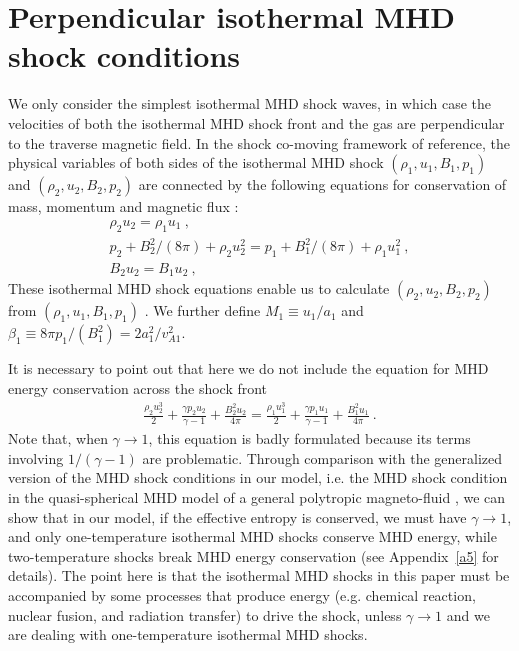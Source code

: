 \documentclass[fleqn,usenatbib]{mnras}
\begin{document}


\section{Perpendicular isothermal MHD shock conditions}
\label{s3}
We only consider the simplest isothermal MHD shock waves, in which case the velocities of both the isothermal MHD shock front and the gas are perpendicular to the traverse magnetic field. In the shock co-moving framework of reference, the physical variables of both sides of the isothermal MHD shock $(\rho_{1}, u_{1}, B_{1}, p_{1})$ and $(\rho_{2}, u_{2}, B_{2}, p_{2})$ are connected by the following equations for conservation of mass, momentum and magnetic flux \citep{yuLou2006}:
\begin{gather}
\rho_{2}u_{2}=\rho_{1}u_{1}\ ,\label{e30}\\
p_{2}+B_{2}^{2}/(8\pi)+\rho_{2}u_{2}^{2}
 =p_{1}+B_{1}^{2}/(8\pi)+\rho_{1}u_{1}^{2}\ ,\label{e31}\\
B_{2}u_{2}=B_{1}u_{2}\ ,\label{e32}
\end{gather}
These isothermal MHD shock equations enable us to calculate $(\rho_{2}, u_{2}, B_{2}, p_{2})$ from $(\rho_{1}, u_{1}, B_{1}, p_{1})$ .
We further define $M_{1}\equiv u_{1}/a_{1}$ and $\beta_{1}\equiv 8\pi p_{1}/\left(B_{1}^{2}\right)=2a_{1}^{2}/v_{A1}^{2}$. 

It is necessary to point out that here we do not include the equation for MHD energy conservation across the shock front 
\begin{gather}
\frac{\rho_{2} u_{2}^{3}}{2}+\frac{\gamma p_{2} u_{2}}{\gamma-1}+\frac{B_{2}^{2}u_{2}}{4\pi}=\frac{\rho_{1} u_{1}^{3}}{2}+\frac{\gamma p_{1} u_{1}}{\gamma-1}+\frac{B_{1}^{2}u_{1}}{4\pi}\ .\label{ex2}
\end{gather}
Note that, when $\gamma\rightarrow 1$, this equation is badly formulated because its terms involving $1/(\gamma-1)$ are problematic. Through comparison with the generalized version of the MHD shock conditions in our model, i.e. the MHD shock condition in the quasi-spherical MHD model of a general polytropic magneto-fluid \citep{wang2008dynamic}, we can show that in our model, if the effective entropy is conserved, we must have $\gamma\rightarrow 1$, and only one-temperature isothermal MHD shocks conserve MHD energy, while two-temperature shocks break MHD energy conservation (see Appendix~\ref{a5} for details). The point here is that the isothermal MHD shocks in this paper must be accompanied by some processes that produce energy (e.g. chemical reaction, nuclear fusion, and radiation transfer) to drive the shock, unless $\gamma\rightarrow 1$ and we are dealing with one-temperature isothermal MHD shocks.
\end{document}
